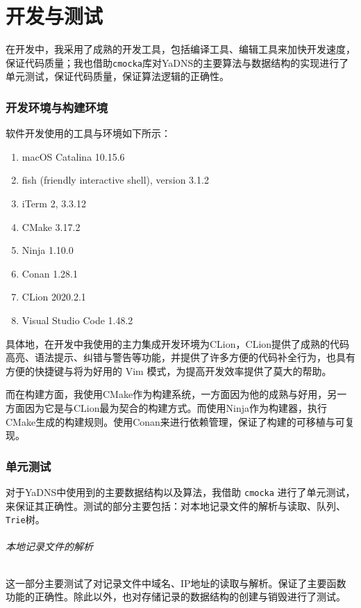 \newpage
\part{开发与测试}

在开发中，我采用了成熟的开发工具，包括编译工具、编辑工具来加快开发速度，保证代码质量；我也借助\lstinline{cmocka}库对YaDNS的主要算法与数据结构的实现进行了单元测试，保证代码质量，保证算法逻辑的正确性。

\section{开发环境与构建环境}

软件开发使用的工具与环境如下所示：
\begin{enumerate}
  \item macOS Catalina 10.15.6
  \item fish (friendly interactive shell), version 3.1.2
  \item iTerm 2, 3.3.12
  \item CMake 3.17.2
  \item Ninja 1.10.0
  \item Conan 1.28.1
  \item CLion 2020.2.1
  \item Visual Studio Code 1.48.2
\end{enumerate}

具体地，在开发中我使用的主力集成开发环境为CLion，CLion提供了成熟的代码高亮、语法提示、纠错与警告等功能，并提供了许多方便的代码补全行为，也具有方便的快捷键与将为好用的 Vim 模式，为提高开发效率提供了莫大的帮助。

而在构建方面，我使用CMake作为构建系统，一方面因为他的成熟与好用，另一方面因为它是与CLion最为契合的构建方式。而使用Ninja作为构建器，执行CMake生成的构建规则。使用Conan来进行依赖管理，保证了构建的可移植与可复现。

\section{单元测试}

对于YaDNS中使用到的主要数据结构以及算法，我借助 \lstinline{cmocka} 进行了单元测试，来保证其正确性。测试的部分主要包括：对本地记录文件的解析与读取、队列、\lstinline{Trie}树。

\paragraph{本地记录文件的解析} 这一部分主要测试了对记录文件中域名、IP地址的读取与解析。保证了主要函数功能的正确性。除此以外，也对存储记录的数据结构的创建与销毁进行了测试。

